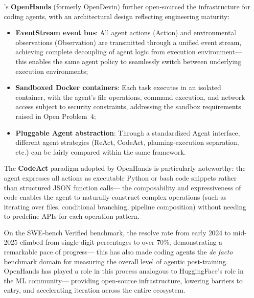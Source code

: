 \citet{wang2024opendevin}'s \textbf{OpenHands} (formerly OpenDevin)
further open-sourced the infrastructure for coding agents,
with an architectural design reflecting engineering maturity:
\begin{itemize}[leftmargin=*]
  \item \textbf{EventStream event bus}: All agent actions (Action) and environmental observations (Observation)
    are transmitted through a unified event stream, achieving complete decoupling of agent logic from execution environment---
    this enables the same agent policy to seamlessly switch between underlying execution environments;
  \item \textbf{Sandboxed Docker containers}: Each task executes in an isolated container,
    with the agent's file operations, command execution, and network access subject to security constraints,
    addressing the sandbox requirements raised in Open Problem~4;
  \item \textbf{Pluggable Agent abstraction}: Through a standardized Agent interface,
    different agent strategies (ReAct, CodeAct, planning-execution separation, etc.)
    can be fairly compared within the same framework.
\end{itemize}
The \textbf{CodeAct} paradigm adopted by OpenHands is particularly noteworthy:
the agent expresses all actions as executable Python or bash code snippets
rather than structured JSON function calls---
the composability and expressiveness of code enables the agent to naturally construct complex operations
(such as iterating over files, conditional branching, pipeline composition)
without needing to predefine APIs for each operation pattern.

On the SWE-bench Verified benchmark,
the resolve rate from early 2024 to mid-2025
climbed from single-digit percentages to over 70\%,
demonstrating a remarkable pace of progress---
this has also made coding agents the \emph{de facto} benchmark domain
for measuring the overall level of agentic post-training.
OpenHands has played a role in this process analogous to HuggingFace's role in the ML community---
providing open-source infrastructure, lowering barriers to entry, and accelerating iteration across the entire ecosystem.

